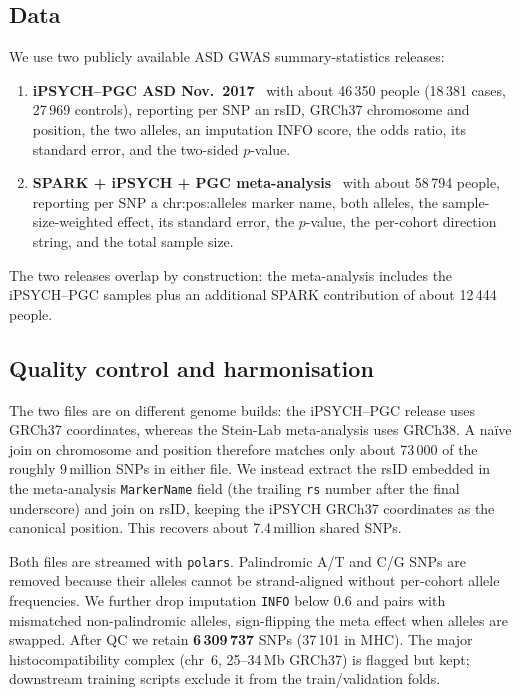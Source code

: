 \subsection{Data}

We use two publicly available ASD GWAS summary-statistics releases:
\begin{enumerate}[nosep,leftmargin=1.2em]
  \item \textbf{iPSYCH--PGC ASD Nov.~2017}~\cite{grove2019} with about
        46\,350 people (18\,381 cases, 27\,969 controls), reporting per
        SNP an rsID, GRCh37 chromosome and position, the two alleles,
        an imputation INFO score, the odds ratio, its standard error,
        and the two-sided $p$-value.
  \item \textbf{SPARK + iPSYCH + PGC meta-analysis}~\cite{matoba2020}
        with about 58\,794 people, reporting per SNP a chr:pos:alleles
        marker name, both alleles, the sample-size-weighted effect,
        its standard error, the $p$-value, the per-cohort direction
        string, and the total sample size.
\end{enumerate}
The two releases overlap by construction: the meta-analysis includes
the iPSYCH--PGC samples plus an additional SPARK contribution of about
12\,444 people.

\subsection{Quality control and harmonisation}

The two files are on different genome builds: the iPSYCH--PGC release
uses GRCh37 coordinates, whereas the Stein-Lab meta-analysis uses
GRCh38. A na\"{i}ve join on chromosome and position therefore matches
only about 73\,000 of the roughly 9\,million SNPs in either file. We
instead extract the rsID embedded in the meta-analysis
\texttt{MarkerName} field (the trailing \texttt{rs} number after the
final underscore) and join on rsID, keeping the iPSYCH GRCh37
coordinates as the canonical position. This recovers about
7.4\,million shared SNPs.

Both files are streamed with \texttt{polars}. Palindromic A/T and C/G
SNPs are removed because their alleles cannot be strand-aligned without
per-cohort allele frequencies. We further drop imputation \texttt{INFO}
below 0.6 and pairs with mismatched non-palindromic alleles, sign-flipping
the meta effect when alleles are swapped. After QC we retain
\textbf{6\,309\,737} SNPs (37\,101 in MHC). The major histocompatibility
complex (chr~6, 25--34\,Mb GRCh37) is flagged but kept; downstream
training scripts exclude it from the train/validation folds.

